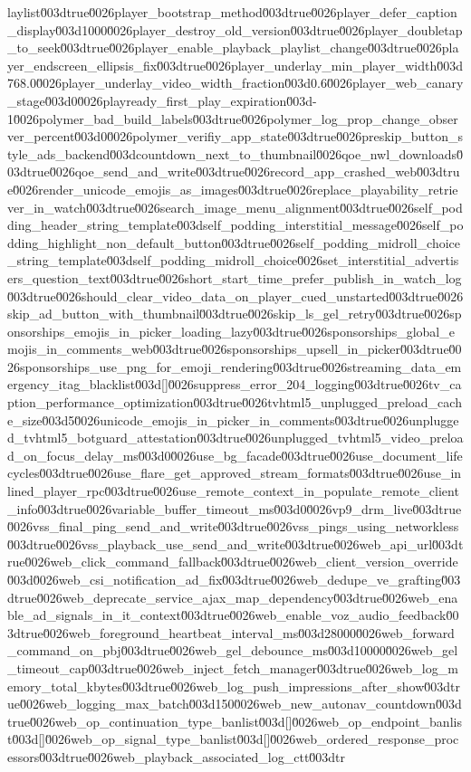 {laylist\u003dtrue\u0026player_bootstrap_method\u003dtrue\u0026player_defer_caption_display\u003d1000\u0026player_destroy_old_version\u003dtrue\u0026player_doubletap_to_seek\u003dtrue\u0026player_enable_playback_playlist_change\u003dtrue\u0026player_endscreen_ellipsis_fix\u003dtrue\u0026player_underlay_min_player_width\u003d768.0\u0026player_underlay_video_width_fraction\u003d0.6\u0026player_web_canary_stage\u003d0\u0026playready_first_play_expiration\u003d-1\u0026polymer_bad_build_labels\u003dtrue\u0026polymer_log_prop_change_observer_percent\u003d0\u0026polymer_verifiy_app_state\u003dtrue\u0026preskip_button_style_ads_backend\u003dcountdown_next_to_thumbnail\u0026qoe_nwl_downloads\u003dtrue\u0026qoe_send_and_write\u003dtrue\u0026record_app_crashed_web\u003dtrue\u0026render_unicode_emojis_as_images\u003dtrue\u0026replace_playability_retriever_in_watch\u003dtrue\u0026search_image_menu_alignment\u003dtrue\u0026self_podding_header_string_template\u003dself_podding_interstitial_message\u0026self_podding_highlight_non_default_button\u003dtrue\u0026self_podding_midroll_choice_string_template\u003dself_podding_midroll_choice\u0026set_interstitial_advertisers_question_text\u003dtrue\u0026short_start_time_prefer_publish_in_watch_log\u003dtrue\u0026should_clear_video_data_on_player_cued_unstarted\u003dtrue\u0026skip_ad_button_with_thumbnail\u003dtrue\u0026skip_ls_gel_retry\u003dtrue\u0026sponsorships_emojis_in_picker_loading_lazy\u003dtrue\u0026sponsorships_global_emojis_in_comments_web\u003dtrue\u0026sponsorships_upsell_in_picker\u003dtrue\u0026sponsorships_use_png_for_emoji_rendering\u003dtrue\u0026streaming_data_emergency_itag_blacklist\u003d[]\u0026suppress_error_204_logging\u003dtrue\u0026tv_caption_performance_optimization\u003dtrue\u0026tvhtml5_unplugged_preload_cache_size\u003d5\u0026unicode_emojis_in_picker_in_comments\u003dtrue\u0026unplugged_tvhtml5_botguard_attestation\u003dtrue\u0026unplugged_tvhtml5_video_preload_on_focus_delay_ms\u003d0\u0026use_bg_facade\u003dtrue\u0026use_document_lifecycles\u003dtrue\u0026use_flare_get_approved_stream_formats\u003dtrue\u0026use_inlined_player_rpc\u003dtrue\u0026use_remote_context_in_populate_remote_client_info\u003dtrue\u0026variable_buffer_timeout_ms\u003d0\u0026vp9_drm_live\u003dtrue\u0026vss_final_ping_send_and_write\u003dtrue\u0026vss_pings_using_networkless\u003dtrue\u0026vss_playback_use_send_and_write\u003dtrue\u0026web_api_url\u003dtrue\u0026web_click_command_fallback\u003dtrue\u0026web_client_version_override\u003d\u0026web_csi_notification_ad_fix\u003dtrue\u0026web_dedupe_ve_grafting\u003dtrue\u0026web_deprecate_service_ajax_map_dependency\u003dtrue\u0026web_enable_ad_signals_in_it_context\u003dtrue\u0026web_enable_voz_audio_feedback\u003dtrue\u0026web_foreground_heartbeat_interval_ms\u003d28000\u0026web_forward_command_on_pbj\u003dtrue\u0026web_gel_debounce_ms\u003d10000\u0026web_gel_timeout_cap\u003dtrue\u0026web_inject_fetch_manager\u003dtrue\u0026web_log_memory_total_kbytes\u003dtrue\u0026web_log_push_impressions_after_show\u003dtrue\u0026web_logging_max_batch\u003d150\u0026web_new_autonav_countdown\u003dtrue\u0026web_op_continuation_type_banlist\u003d[]\u0026web_op_endpoint_banlist\u003d[]\u0026web_op_signal_type_banlist\u003d[]\u0026web_ordered_response_processors\u003dtrue\u0026web_playback_associated_log_ctt\u003dtr}
